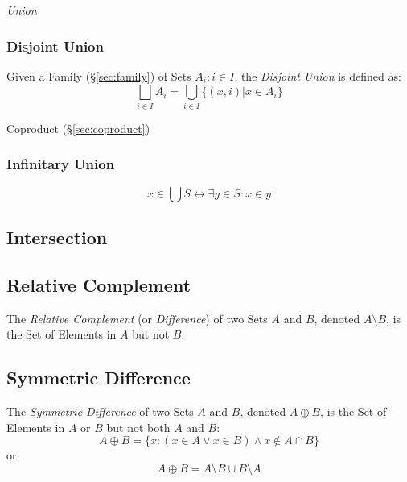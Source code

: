 \emph{Union}



\subsubsection{Disjoint Union}\label{sec:disjoint_union}

Given a Family (\S\ref{sec:family}) of Sets ${A_i : i \in I}$,
the \emph{Disjoint Union} is defined as:
\[
  \bigsqcup_{i \in I} A_i = \bigcup_{i \in I} \{(x,i) | x \in A_i \}
\]

Coproduct (\S\ref{sec:coproduct})



\subsubsection{Infinitary Union}\label{sec:infinitary_union}

\[
  x \in \bigcup S \leftrightarrow \exists y \in S : x \in y
\]



\subsection{Intersection}\label{sec:intersection}

\subsection{Relative Complement}\label{sec:relative_complement}

The \emph{Relative Complement} (or \emph{Difference}) of two Sets $A$
and $B$, denoted $A \setminus B$, is the Set of Elements in $A$ but
not $B$.



\subsection{Symmetric Difference}\label{sec:symmetric_difference}

The \emph{Symmetric Difference} of two Sets $A$ and $B$, denoted $A
\oplus B$, is the Set of Elements in $A$ or $B$ but not both $A$ and
$B$:
\[
  A \oplus B =
  \{ x : (x \in A \vee x \in B) \wedge x \notin A \cap B \}
\]
or:
\[
  A \oplus B = A \setminus B \cup B \setminus A
\]



